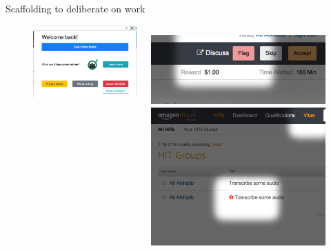 \documentclass[presentation]{subfiles}
\begin{document}
\begin{frame}{Scaffolding to deliberate on work}
\begin{figure}
  \begin{columns}
  \begin{column}{0.45\textwidth}
  \includegraphics[width=\textwidth]{../common_figures/vitae/extension_popup.png}
  \end{column}
  \begin{column}[c]{0.45\textwidth}
  \includegraphics[width=\textwidth]{../common_figures/vitae/flagging.png}
  \includegraphics[width=\textwidth]{../common_figures/vitae/flagged.png}
  \end{column}
  \end{columns}
  \end{figure}
\end{frame}
\end{document}
